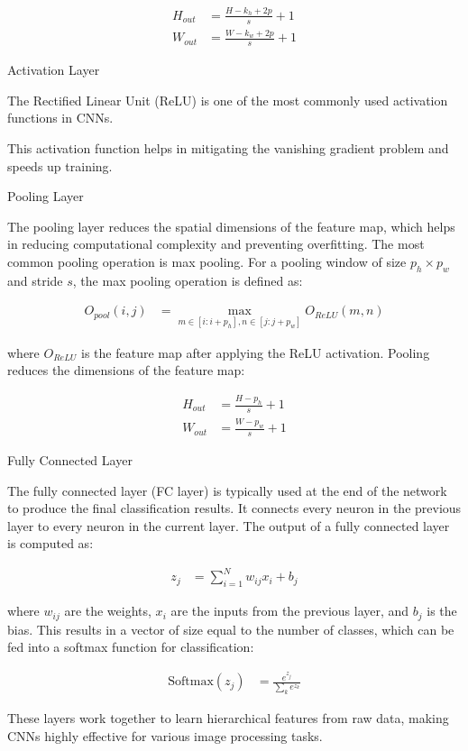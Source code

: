 \begin{align}
  H_{out} &= \frac{H - k_h + 2p}{s} + 1 \\
  W_{out} &= \frac{W - k_w + 2p}{s} + 1
\end{align}

Activation Layer 

The Rectified Linear Unit (ReLU) is one of the most commonly used activation functions in CNNs.

This activation function helps in mitigating the vanishing gradient problem and speeds up training.

Pooling Layer

The pooling layer reduces the spatial dimensions of the feature map, which helps in reducing computational complexity and preventing overfitting.
The most common pooling operation is max pooling.
For a pooling window of size \( p_h \times p_w \) and stride \( s \), the max pooling operation is defined as:

\begin{align}
  O_{pool}(i, j) &= \max_{m \in [i:i+p_h], n \in [j:j+p_w]} O_{ReLU}(m, n)
\end{align}

where \( O_{ReLU} \) is the feature map after applying the ReLU activation.
Pooling reduces the dimensions of the feature map:

\begin{align}
  H_{out} &= \frac{H - p_h}{s} + 1 \\
  W_{out} &= \frac{W - p_w}{s} + 1
\end{align}

Fully Connected Layer

The fully connected layer (FC layer) is typically used at the end of the network to produce the final classification results.
It connects every neuron in the previous layer to every neuron in the current layer.
The output of a fully connected layer is computed as:

\begin{align}
  z_j &= \sum_{i=1}^{N} w_{ij} x_i + b_j
\end{align}

where \( w_{ij} \) are the weights, \( x_i \) are the inputs from the previous layer, and \( b_j \) is the bias.
This results in a vector of size equal to the number of classes, which can be fed into a softmax function for classification:

\begin{align}
  \text{Softmax}(z_j) &= \frac{e^{z_j}}{\sum_{k} e^{z_k}}
\end{align}

These layers work together to learn hierarchical features from raw data, making CNNs highly effective for various image processing tasks.


